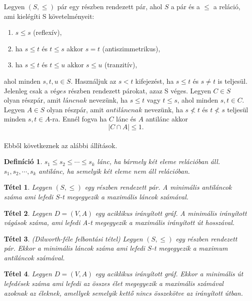 \documentclass[12pt]{article}
\newtheorem{defin}{Definíció}[section]
\newtheorem{tetel}{Tétel}[section]
\begin{document}
Legyen $(S,\leq)$ pár egy részben rendezett pár, ahol $S$ a pár és a  $\leq$ a reláció, ami kielégíti S követelményeit:
\begin{enumerate}
\item$s \leq s$ (reflexív),
\item ha $s \leq t$ és $t \leq s$ akkor $s = t$ (antiszimmetrikus),
\item ha $s \leq t$ és $t \leq u$ akkor $s \leq u$ (tranzitív),
\end{enumerate}
ahol minden $s,t,u \in S$. Használjuk az $s < t$ kifejezést, ha $s \leq t$ és $s \neq t$ is teljesül. Jelenleg csak a $véges$ részben rendezett párokat, azaz S véges.
Legyen $C \in S$ olyan részpár, amit $láncnak$ nevezünk, ha $s \leq t$ vagy $t \leq s$, ahol minden $s,t \in C$. Legyen $A \in S$ olyan részpár, amit $antiláncnak$ nevezünk, ha $s \nless t$ és $t \nless s$ teljesül minden $s,t 
\in A$-ra. Ennél fogva ha $C$ lánc és $A$ antilánc akkor
$$|C \cap A| \leq 1.$$\\
Ebből következnek az alábbi állítások. ~\cite{bomze1999maximum}\\

\begin{defin}
$s_1 \leq s_2 \leq \cdots \leq s_k$ lánc, ha bármely két eleme relációban áll. $s_1,s_2, \cdots ,s_k$ antilánc, ha semelyik két eleme nem áll relációban. ~\cite{bomze1999maximum}
\end{defin}

\begin{tetel}
Legyen $(S, \leq)$ egy részben rendezett pár. A minimális antiláncok száma ami lefedi $S$-t megegyezik a maximális láncok számával. ~\cite{bomze1999maximum}
\end{tetel}

\begin{tetel}
Legyen $D = (V,A)$ egy  aciklikus irányított gráf. A minimális irányított vágások száma, ami lefedi A-t megegyezik a maximális irányított út hosszával. ~\cite{bomze1999maximum}
\end{tetel}

\begin{tetel}
(Dilworth-féle felbontási tétel) Legyen $(S, \leq)$ egy részben rendezett pár. Ekkor a minimális láncok száma ami lefedi $S$-t megegyezik a maximum antiláncok számával. ~\cite{bomze1999maximum}
\end{tetel}

\begin{tetel}
Legyen $D = (V,A)$ egy aciklikus irányított gráf. Ekkor a minimális út lefedések száma ami lefedi az összes élet megegyezik a maximális számával azoknak az éleknek, amellyek semelyik kettő nincs összekötve az irányított útban. ~\cite{bomze1999maximum}
\end{tetel}
\end{document}
